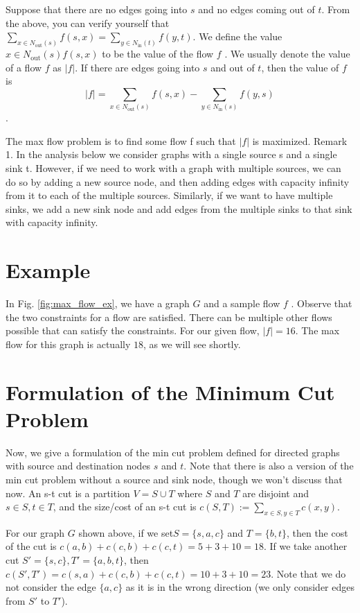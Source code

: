 \documentclass [12pt]{article}
\theoremstyle{definition}
\begin{document}
Suppose that there are no edges going into $s$ and no edges coming out of $t$. From the above, you can verify yourself that $\sum_{x \in N_{\text{out}}(s)} f (s, x) = \sum_{y \in N_{\text{in}}(t)} f (y, t)$. We define the value $x \in N_{\text{out}}(s) f (s, x)$ to be the value of the flow $f$ . We usually denote the value of a flow $f$ as $|f |$. If there are edges going into $s$ and out of $t$, then the value of $f$ is $$
|f | = \sum_{x \in N_{\text{out}}(s)} f (s, x) - \sum_{ y \in N_{\text{in}}(s)} f (y, s)
$$.

The max flow problem is to find some flow f such that $|f |$ is maximized. Remark 1. In the analysis below we consider graphs with a single source s and a single sink t. However, if we need to work with a graph with multiple sources, we can do so by adding a new source node, and then adding edges with capacity infinity from it to each of the multiple sources. Similarly, if we want to have multiple sinks, we add a new sink node and add edges from the multiple sinks to that sink with capacity infinity.

\section{Example}

In Fig. \ref{fig:max_flow_ex}, we have a graph $G$ and a sample flow $f$ . Observe that the two constraints for a flow are satisfied. There can be multiple other flows possible that can satisfy the constraints. For our given flow, $|f | = 16$. The max flow for this graph is actually $18$, as we will see shortly.


\section{Formulation of the Minimum Cut Problem}

Now, we give a formulation of the min cut problem defined for directed graphs with source and destination nodes $s$ and $t$. Note that there is also a version of the min cut problem without a source and sink node, though we won't discuss that now. An s-t cut is a partition $V = S \cup T$ where $S$ and $T$ are disjoint and $s \in S, t \in T$, and the size/cost of an s-t cut is $c(S, T) := \sum_{x\in S, y\in T} c(x, y )$.

For our graph $G$ shown above, if we set$ S = \{s, a, c\}$ and $T = \{b, t\}$, then the cost of the cut is $c(a, b) + c(c, b) + c(c, t) = 5 + 3 + 10 = 18$. If we take another cut $S
' = \{s, c\}, T' = \{a, b, t\}$, then $c(S', T') = c(s, a) + c(c, b) + c(c, t) = 10 + 3 + 10 = 23$. Note that we do
not consider the edge $\{a, c\}$ as it is in the wrong direction (we only consider edges from $S'$ to $ T'$).
\end{document}
